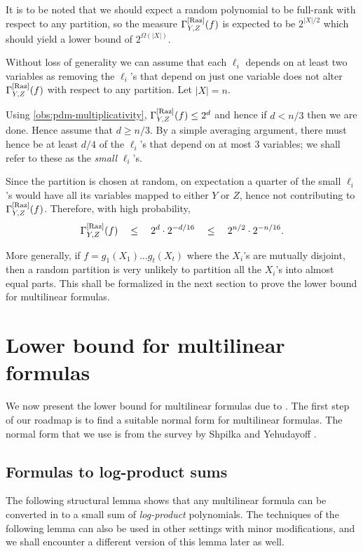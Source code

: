It is to be noted that we should expect a random polynomial to be full-rank with respect to any partition, so the measure $\Gamma^{\mathrm{[Raz]}}_{Y,Z}(f)$ is expected to be $2^{|X|/2}$ which should yield a lower bound of $2^{\Omega(|X|)}$. 

\begin{proof-sketch}
Without loss of generality we can assume that each $\ell_i$ depends on at least two variables as removing the $\ell_i$'s that depend on just one variable does not alter $\Gamma^{\mathrm{[Raz]}}_{Y,Z}(f)$ with respect to any partition. 
Let $|X| = n$. 

Using \autoref{obs:pdm-multiplicativity}, $\Gamma^{\mathrm{[Raz]}}_{Y,Z}(f) \leq 2^d$ and hence if $d < n/3$ then we are done. 
Hence assume that $d \geq n/3$. 
By a simple averaging argument, there must hence be at least $d/4$ of the $\ell_i$'s that depend on at most $3$ variables; we shall refer to these as the \emph{small} $\ell_i$'s. 

Since the partition is chosen at random, on expectation a quarter of the small $\ell_i$'s would have all its variables mapped to either $Y$ or $Z$, hence not contributing to $\Gamma^{\mathrm{[Raz]}}_{Y,Z}(f)$. 
Therefore, with high probability,
$$
\Gamma^{\mathrm{[Raz]}}_{Y,Z}(f) \quad \leq \quad 2^{d} \cdot 2^{-d/16} \quad \leq \quad 2^{n/2} \cdot 2^{-n/16}.
$$
\end{proof-sketch}

More generally, if $f = g_1(X_1)\dots g_t(X_t)$ where the $X_i$'s are mutually disjoint, then a random partition is very unlikely to partition all the $X_i$'s into almost equal parts. 
This shall be formalized in the next section to prove the lower bound for multilinear formulas. 

\section{Lower bound for multilinear formulas}
	We now present the lower bound for multilinear formulas due 
	to \cite{raz2004}. 
The first step of our roadmap is to find 
	a suitable normal form for multilinear formulas. 
The normal 
	form that we use is from the survey by Shpilka and 
	Yehudayoff \cite{sy}. 	

\subsection{Formulas to log-product sums}

The following structural lemma shows that any multilinear formula can be converted in to a small sum of \emph{log-product} polynomials. 
The techniques of the following lemma can also be used in other settings with minor modifications, and we shall encounter a different version of this lemma later as well.

